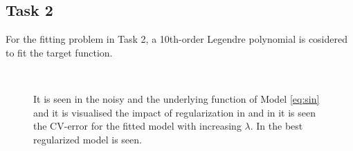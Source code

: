 \documentclass[a4paper,10pt]{article}
\begin{document}
\subsection{Task 2}
For the fitting problem in Task 2, a 10th-order Legendre polynomial is cosidered to
fit the target function.
\begin{figure}[H]
   \\

  \caption{It is seen in \protect {} the noisy and the underlying function
  of Model {\ref{eq:sin}} and it is visualised the impact of regularization in
  \protect {} and
  in \protect {} it is seen the
  CV-error for the fitted model with increasing $\lambda$. In \protect
   the best regularized model is seen.
  }
\end{figure}
\end{document}
